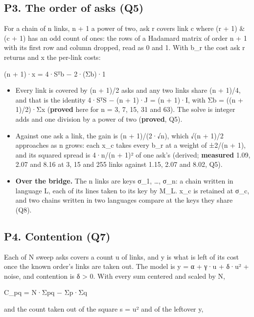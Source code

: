 \subsection{\texorpdfstring{P3. The order of asks (Q5)}{P3. The order of asks (Q5)}}

For a chain of n links, n + 1 a power of two, ask r covers link c where (r + 1) \& (c + 1) has an odd count of ones: the rows of a Hadamard matrix of order n + 1 with its first row and column dropped, read as 0 and 1. With b\_\allowbreak{}r the cost ask r returns and x the per-link costs:

(n + 1)·x = 4·Sᵀb − 2·(Σb)·1

\begin{itemize}
\item Every link is covered by (n + 1)/2 asks and any two links share (n + 1)/4, and that is the identity 4·SᵀS − (n + 1)·J = (n + 1)·I, with Σb = ((n + 1)/2)·Σx (\textbf{proved} here for n = 3, 7, 15, 31 and 63). The solve is integer adds and one division by a power of two (\textbf{proved}, Q5).
\item Against one ask a link, the gain is (n + 1)/(2·√n), which √(n + 1)/2 approaches as n grows: each x\_\allowbreak{}c takes every b\_\allowbreak{}r at a weight of ±2/(n + 1), and its squared spread is 4·n/(n + 1)² of one ask's (derived; \textbf{measured} 1.09, 2.07 and 8.16 at 3, 15 and 255 links against 1.15, 2.07 and 8.02, Q5).
\item \textbf{Over the bridge.} The n links are keys σ\_\allowbreak{}1, …, σ\_\allowbreak{}n: a chain written in language L, each of its lines taken to its key by M\_\allowbreak{}L. x\_\allowbreak{}c is retained at σ\_\allowbreak{}c, and two chains written in two languages compare at the keys they share (Q8).
\end{itemize}

\subsection{\texorpdfstring{P4. Contention (Q7)}{P4. Contention (Q7)}}

Each of N sweep asks covers a count u of links, and y is what is left of its cost once the known order's links are taken out. The model is y = α + γ·u + δ·u² + noise, and contention is δ > 0. With every sum centered and scaled by N,

C\_\allowbreak{}pq = N·Σpq − Σp·Σq

and the count taken out of the square s = u² and of the leftover y,

